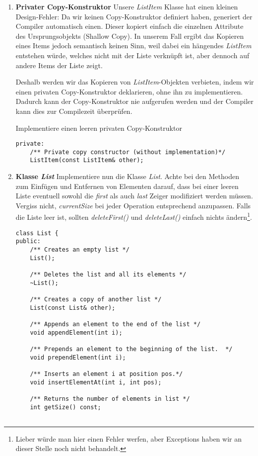 \documentclass[
  accentcolor=tud1c,	%
  colorbacktitle,		%
  inverttitle,			%
  german,				%
  twoside
]{tudexercise}
\begin{document}
\begin{enumerate}
\item \textbf{Privater Copy-Konstruktor}
Unsere \emph{ListItem} Klasse hat einen kleinen Design-Fehler:
Da wir keinen Copy-Konstruktor definiert haben, generiert der Compiler automatisch einen.
Dieser kopiert einfach die einzelnen Attribute des Ursprungsobjekts (Shallow Copy).
In unserem Fall ergibt das Kopieren eines Items jedoch semantisch keinen Sinn, weil dabei ein hängendes \emph{ListItem} entstehen würde, welches nicht mit der Liste verknüpft ist, aber dennoch auf andere Items der Liste zeigt. 

Deshalb werden wir das Kopieren von \emph{ListItem}-Objekten verbieten, indem wir einen privaten Copy-Konstruktor deklarieren, ohne ihn zu implementieren.
Dadurch kann der Copy-Konstruktor nie aufgerufen werden und der Compiler kann dies zur Compilezeit überprüfen.

Implementiere einen leeren privaten Copy-Konstruktor
\begin{lstlisting}
private:
	/** Private copy constructor (without implementation)*/
	ListItem(const ListItem& other);
\end{lstlisting}

\item \textbf{Klasse \emph{List}}
Implementiere nun die Klasse \emph{List}.
Achte bei den Methoden zum Einfügen und Entfernen von Elementen darauf, dass bei einer leeren Liste eventuell sowohl die \emph{first} als auch \emph{last} Zeiger modifiziert werden müssen.
Vergiss nicht, \emph{currentSize} bei jeder Operation entsprechend anzupassen.
Falls die Liste leer ist, sollten \emph{deleteFirst()} und \emph{deleteLast()} einfach nichts ändern\footnote{Lieber würde man hier einen Fehler werfen, aber Exceptions haben wir an dieser Stelle noch nicht behandelt.}.
\begin{lstlisting}
class List {
public:
	/** Creates an empty list */
	List();

	/** Deletes the list and all its elements */
	~List();
	
	/** Creates a copy of another list */
	List(const List& other);

	/** Appends an element to the end of the list */
	void appendElement(int i);

	/** Prepends an element to the beginning of the list.  */
	void prependElement(int i);
	
	/** Inserts an element i at position pos.*/
	void insertElementAt(int i, int pos);

	/** Returns the number of elements in list */
	int getSize() const;


\end{lstlisting}
\end{enumerate}
\end{document}
